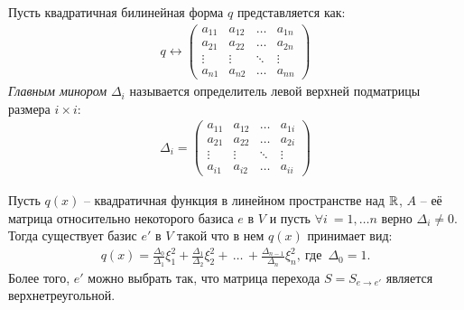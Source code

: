 \begin{definition}
    Пусть квадратичная билинейная форма $q$ представляется как: \begin{gather*}
        q \leftrightarrow \begin{pmatrix}
        a_{11} & a_{12} & \dots  & a_{1n}   \\
        a_{21} & a_{22} & \dots  & a_{2n}   \\
        \vdots & \vdots & \ddots & \vdots   \\
        a_{n1} & a_{n2} & \dots  & a_{nn}
        \end{pmatrix}
    \end{gather*}
    \textit{Главным минором} $\Delta_i$ называется определитель левой верхней подматрицы размера $i \times i$:
    \begin{gather*}
        \Delta_i = \begin{pmatrix}
            a_{11} & a_{12} & \dots  & a_{1i}   \\
            a_{21} & a_{22} & \dots  & a_{2i}   \\
            \vdots & \vdots & \ddots & \vdots   \\
            a_{i1} & a_{i2} & \dots  & a_{ii}
        \end{pmatrix}
    \end{gather*} 
\end{definition}

\begin{theorem}[Як\'{о}би]
    Пусть $q(x)$ -- квадратичная функция в линейном пространстве над $\mathbb{R}$, $A$ -- её матрица относительно 
    некоторого базиса $e$ в $V$ и пусть $\forall i \: = 1, \dots n$ верно $\Delta_i \neq 0$. Тогда 
    существует базис $e'$ в $V$ такой что в нем $q(x)$ принимает вид: 
    \begin{gather*}
        q(x) = \frac{\Delta_0}{\Delta_1} \xi_1^2 + \frac{\Delta_1}{\Delta_2} \xi_2^2 + \, \dots \,+ 
        \frac{\Delta_{n-1}}{\Delta_n} \xi_n^2, \: \text{где } \, \Delta_0 = 1. 
    \end{gather*}
    Более того, $e'$ можно выбрать так, что матрица перехода $S = S_{e \to e'}$ 
    является верхнетреугольной. 
\end{theorem}

